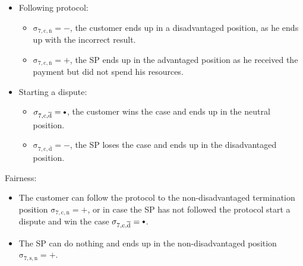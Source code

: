 \documentclass{ieeeaccess}
\newcommand\sbullet[1][.75]{\mathbin{\ThisStyle{\vcenter{\hbox{%
  \scalebox{#1}{$\SavedStyle\bullet$}}}}}%
}
\begin{document}
\begin{itemize}
\item
  Following protocol:

  \begin{itemize}
  
  \item
    \(\operatorname{\sigma_{7, c, \overline{n}} = -}\), the customer ends up in a disadvantaged position, as he ends up with the incorrect result.
  \item
    \(\operatorname{\sigma_{7, c, \overline{n}} = +}\), the SP ends up in the advantaged position as he received the payment but did not spend his resources.
  \end{itemize}
\item
  Starting a dispute:

  \begin{itemize}
  
  \item
    \(\operatorname{\sigma_{7, c, \overline{d}} = \sbullet}\), the customer wins the case and ends up in the neutral position.
  \item
    \(\operatorname{\sigma_{7, c, \overline{d}} = -}\), the SP loses the case and ends up in the disadvantaged position.
  \end{itemize}
\end{itemize}

Fairness:

\begin{itemize}

\item
  The customer can follow the protocol to the non-disadvantaged termination position \(\operatorname{\sigma_{7, c, n} = +}\), or in case the SP has not followed the protocol start a dispute and win the case \(\operatorname{\sigma_{7, c, \overline{d}} = \sbullet}\).
\item
  The SP can do nothing and ends up in the non-disadvantaged position \(\operatorname{\sigma_{7, s, n} = +}\).
\end{itemize}
\end{document}
